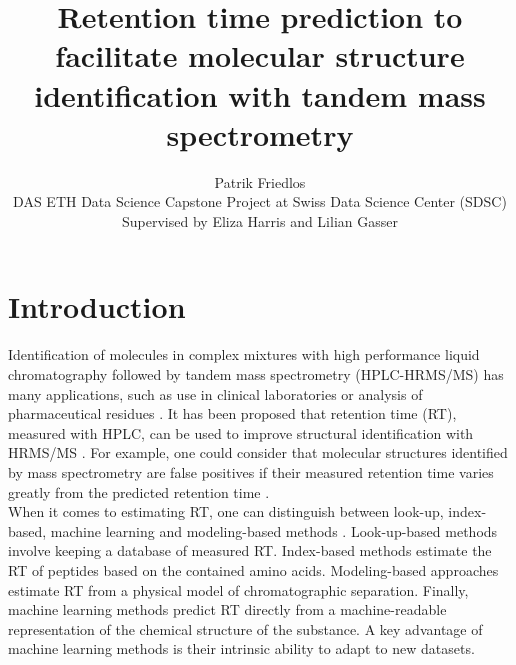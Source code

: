 \documentclass{article}
\title{Retention time prediction to facilitate molecular structure identification with tandem mass spectrometry}
\author{Patrik Friedlos\\
  \small DAS ETH Data Science Capstone Project at Swiss Data Science Center (SDSC)\\
  \small Supervised by Eliza Harris and Lilian Gasser
}
\begin{document}
\maketitle


\section{Introduction}

Identification of molecules in complex mixtures with high performance liquid chromatography followed by tandem mass spectrometry (HPLC-HRMS/MS) has many applications, such as use in clinical laboratories or analysis of pharmaceutical residues \cite{van2012role, petrovic2005liquid}. It has been proposed that retention time (RT), measured with HPLC, can be used to improve structural identification with HRMS/MS \cite{strittmatter2004application}. For example, one could consider that molecular structures identified by mass spectrometry are false positives if their measured retention time varies greatly from the predicted retention time \cite{yang2021prediction}.\\

When it comes to estimating RT, one can distinguish between look-up, index-based, machine learning and modeling-based methods \cite{moruz2017peptide}. Look-up-based methods involve keeping a database of measured RT. Index-based methods estimate the RT of peptides based on the contained amino acids. Modeling-based approaches estimate RT from a physical model of chromatographic separation. Finally, machine learning methods predict RT directly from a machine-readable representation of the chemical structure of the substance. A key advantage of machine learning methods is their intrinsic ability to adapt to new datasets.\\
\end{document}
